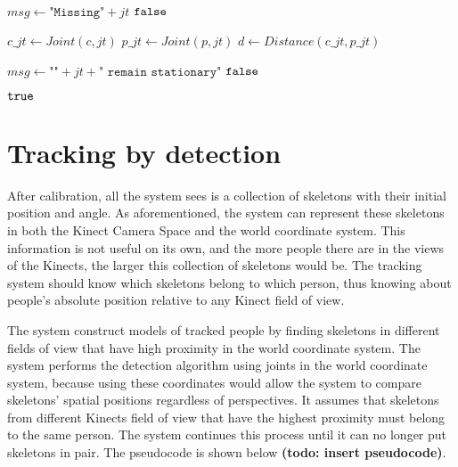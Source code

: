 \begin{algorithm}[!h,width=0.9\columnwidth]
    \caption{$\Function{IsStationary}(jt, c, p, msg)$}
    \\
    \label{algo:algo_defect}
    \begin{algorithmic}[1]
        \setcounter{ALC@line}{0}
        \vspace*{1mm}

          \STATE $msg \leftarrow \texttt{"Missing"} + jt$
          \RETURN $\False$
        \ENDIF

        \STATE $c\_jt \leftarrow Joint(c, jt)$
        \STATE $p\_jt \leftarrow Joint(p, jt)$
        \STATE $d \leftarrow Distance(c\_jt, p\_jt)$

          \STATE $msg \leftarrow \texttt{""} + jt + \texttt{" remain stationary"}$
          \RETURN $\False$
        \ENDIF

        \RETURN $\True$
    \end{algorithmic}
\end{algorithm}

\section{Tracking by detection}
\label{sec:current_approach_tracking_by_detection}

After calibration, all the system sees is a collection of skeletons with their initial position and angle. As aforementioned, the system can represent these skeletons in both the Kinect Camera Space and the world coordinate system. This information is not useful on its own, and the more people there are in the views of the Kinects, the larger this collection of skeletons would be. The tracking system should know which skeletons belong to which person, thus knowing about people's absolute position relative to any Kinect field of view.

The system construct models of tracked people by finding skeletons in different fields of view that have high proximity in the world coordinate system. The system performs the detection algorithm using joints in the world coordinate system, because using these coordinates would allow the system to compare skeletons' spatial positions regardless of perspectives. It assumes that skeletons from different Kinects field of view that have the highest proximity must belong to the same person. The system continues this process until it can no longer put skeletons in pair. The pseudocode is shown below \textbf{(todo: insert pseudocode)}.

